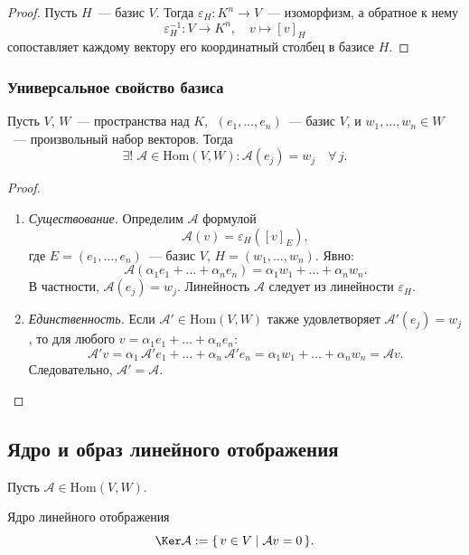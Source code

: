 \begin{proof}
	Пусть $H$~--- базис $V$. Тогда $\varepsilon_H \colon K^n \to V$~--- изоморфизм, а обратное к нему
	\[
	\varepsilon_H^{-1} \colon V \longrightarrow K^n, \quad v \longmapsto [v]_H
	\]
	сопоставляет каждому вектору его координатный столбец в базисе $H$.
\end{proof}

\subsubsection*{Универсальное свойство базиса}

\begin{Proposition}{}{}
	Пусть $V$, $W$~--- пространства над $K$, $\;(e_1, \ldots, e_n)$~--- базис $V$,
	и $w_1, \ldots, w_n \in W$~--- произвольный набор векторов. Тогда
	\[
	\exists!\; \mathcal{A} \in \mathrm{Hom}(V, W) \colon \mathcal{A}(e_j) = w_j \quad \forall\, j.
	\]
\end{Proposition}

\begin{proof}
	\begin{enumerate}
		\item \textit{Существование.} Определим $\mathcal{A}$ формулой
		\[
		\mathcal{A}(v) = \varepsilon_H\!\left([v]_E\right),
		\]
		где $E = (e_1, \ldots, e_n)$~--- базис $V$, $H = (w_1, \ldots, w_n)$. Явно:
		\[
		\mathcal{A}(\alpha_1 e_1 + \ldots + \alpha_n e_n) = \alpha_1 w_1 + \ldots + \alpha_n w_n.
		\]
		В частности, $\mathcal{A}(e_j) = w_j$. Линейность $\mathcal{A}$ следует из линейности $\varepsilon_H$.
		
		\item \textit{Единственность.} Если $\mathcal{A}' \in \mathrm{Hom}(V, W)$ также удовлетворяет $\mathcal{A}'(e_j) = w_j$, то для любого $v = \alpha_1 e_1 + \ldots + \alpha_n e_n$:
		\[
		\mathcal{A}'v = \alpha_1\,\mathcal{A}'e_1 + \ldots + \alpha_n\,\mathcal{A}'e_n = \alpha_1 w_1 + \ldots + \alpha_n w_n = \mathcal{A}v.
		\]
		Следовательно, $\mathcal{A}' = \mathcal{A}$.
	\end{enumerate}
\end{proof}

\subsection{Ядро и образ линейного отображения}

Пусть $\mathcal{A} \in \mathrm{Hom}(V, W)$.

\begin{Definition}{Ядро линейного отображения}{}
	\[
	\Ker\mathcal{A} := \{\, v \in V \mid \mathcal{A}v = 0 \,\}.
	\]
\end{Definition}

